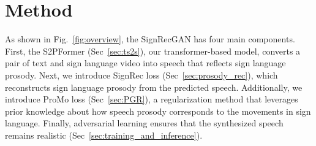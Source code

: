 \section{Method}
\label{sec:method}


As shown in Fig.~\ref{fig:overview}, 
the SignRecGAN has four main components.
First, the S2PFormer (Sec~\ref{sec:ts2s}), our transformer-based model, converts a pair of text and sign language video into speech that reflects sign language prosody.
Next, we introduce SignRec loss (Sec~\ref{sec:prosody_rec}), which reconstructs sign language prosody from the predicted speech. 
Additionally, we introduce ProMo loss (Sec~\ref{sec:PGR}),
a regularization method that leverages prior knowledge about
how speech prosody corresponds to the movements in sign language.
Finally, adversarial learning ensures that the synthesized speech remains realistic (Sec~\ref{sec:training_and_inference}).

